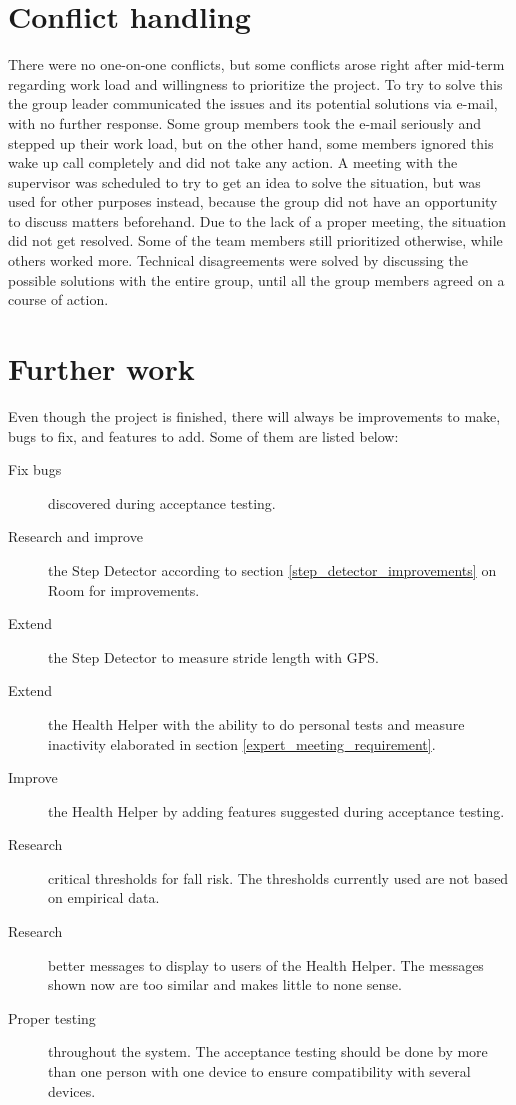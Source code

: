 \section{Conflict handling}
There were no one-on-one conflicts, but some conflicts arose right after mid-term regarding work load and willingness to prioritize the project. To try to solve this the group leader communicated the issues and its potential solutions via e-mail, with no further response. Some group members took the e-mail seriously and stepped up their work load, but on the other hand, some members ignored this wake up call completely and did not take any action. A meeting with the supervisor was scheduled to try to get an idea to solve the situation, but was used for other purposes instead, because the group did not have an opportunity to discuss matters beforehand. Due to the lack of a proper meeting, the situation did not get resolved. Some of the team members still prioritized otherwise, while others worked more.
Technical disagreements were solved by discussing the possible solutions with the entire group, until all the group members agreed on a course of action.

\section{Further work}
Even though the project is finished, there will always be improvements to make, bugs to fix, and features to add. Some of them are listed below:
\begin{description}
\item[Fix bugs] discovered during acceptance testing.
\item[Research and improve] the Step Detector according to section \ref{step_detector_improvements} on Room for improvements. 
\item[Extend] the Step Detector to measure stride length with GPS.
\item[Extend] the Health Helper with the ability to do personal tests and measure inactivity elaborated in section \ref{expert_meeting_requirement}.
\item[Improve] the Health Helper by adding features suggested during acceptance testing.
\item[Research] critical thresholds for fall risk. The thresholds currently used are not based on empirical data.
\item[Research] better messages to display to users of the Health Helper. The messages shown now are too similar and makes little to none sense.
\item[Proper testing] throughout the system. The acceptance testing should be done by more than one person with one device to ensure compatibility with several devices.
\end{description}
